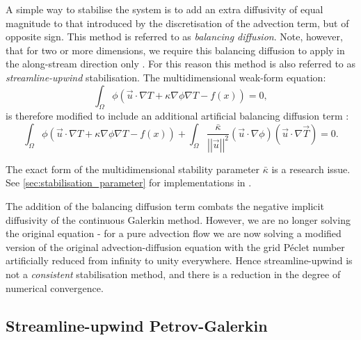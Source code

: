 A simple way to stabilise the system is to add an extra diffusivity of
equal magnitude to that introduced by the discretisation of the advection term,
but of opposite sign. This method is referred to as \textit{balancing diffusion}.
Note, however, that for two or more dimensions, we require this balancing
diffusion to apply in the along-stream direction only \citep{brooks1982, DoneaBook}.
For this reason this method is also referred to as \textit{streamline-upwind}
stabilisation. The multidimensional weak-form equation:
\begin{equation}\label{eqn:trivial_advdif_weak_md}
  \int_\Omega \phi (\vec{u} \cdot \nabla T + \kappa \nabla \phi \nabla T -f(x)) = 0,
\end{equation}
is therefore modified to include an additional artificial balancing diffusion
term \citep{DoneaBook}:
\begin{equation}\label{eqn:balancing_diffusion}
  \int_\Omega \phi (\vec{u} \cdot \nabla T + \kappa \nabla \phi \nabla T - f(x)) + 
  \int_\Omega \frac{\bar{\kappa}}{\left|\left| \vec{u} \right|\right|^2}
  (\vec{u} \cdot \nabla \phi) (\vec{u} \cdot \nabla \vec{T}) 
  = 0.
\end{equation}

The exact form of the multidimensional stability parameter $\bar{\kappa}$
is a research issue. See \ref{sec:stabilisation_parameter} for implementations in
\fluidity.

The addition of the balancing diffusion term combats the negative implicit
diffusivity of the continuous Galerkin method. However, we are no longer solving
the original equation - for a pure advection flow we are now solving a modified
version of the original advection-diffusion equation with the grid
P\'eclet number artificially reduced from
infinity to unity everywhere. Hence streamline-upwind is not a \textit{consistent}
stabilisation method, and there is a reduction in the degree of numerical
convergence.

\subsection{Streamline-upwind Petrov-Galerkin}\label{sec:supg}

